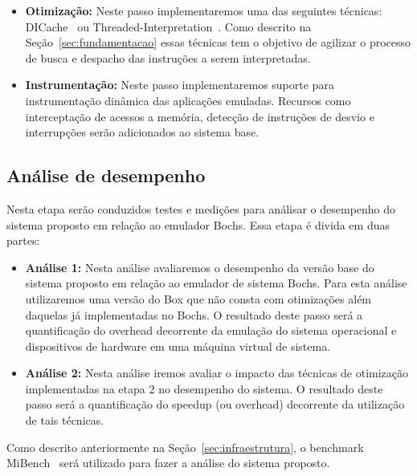 \documentclass[11pt,twoside]{article}
\begin{document}
\begin{itemize}
    \item \textbf{Otimização:} Neste passo implementaremos uma das seguintes 
    técnicas: DICache~\cite{Chen2012} ou Threaded-Interpretation~\cite{Klint1981}.
    Como descrito na Seção~\ref{sec:fundamentacao} essas técnicas tem o objetivo 
    de agilizar o processo de busca e despacho das instruções a serem interpretadas.
 
    \item \textbf{Instrumentação:} Neste passo implementaremos suporte para 
    instrumentação dinâmica das aplicações emuladas. Recursos como interceptação
    de acessos a memória, detecção de instruções de desvio e interrupções serão 
    adicionados ao sistema base.
\end{itemize}
 
\subsection{Análise de desempenho}

Nesta etapa serão conduzidos testes e medições para análisar o desempenho do sistema
proposto em relação ao emulador Bochs. Essa etapa é divida em duas partes:

\begin{itemize}
    \item \textbf{Análise 1:} Nesta análise avaliaremos o desempenho da versão 
    base do sistema proposto em relação ao emulador de sistema Bochs. Para esta 
    análise utilizaremos uma versão do Box que não consta com otimizações além 
    daquelas já implementadas no Bochs. O resultado deste passo será a quantificação
    do overhead decorrente da emulação do sistema operacional e dispositivos de
    hardware em uma máquina virtual de sistema. 
    
    \item \textbf{Análise 2:} Nesta análise iremos avaliar o impacto das técnicas 
    de otimização implementadas na etapa 2 no desempenho do sistema. O resultado
    deste passo será a quantificação do speedup (ou overhead) decorrente da 
    utilização de tais técnicas.
\end{itemize}

Como descrito anteriormente na Seção~\ref{sec:infraestrutura}, o benchmark 
MiBench~\cite{Guthaus2001} será utilizado para fazer a análise do sistema
proposto.
\end{document}
